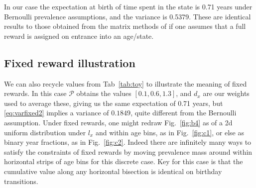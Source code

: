 \documentclass{bmcart}
\begin{document}
In our case the expectation at birth of time spent in the state is 0.71 years under Bernoulli prevalence assumptions, and the variance is 0.5379. These are identical results to those obtained from the matrix methods of \cite{caswell2018matrix} if one assumes that a full reward is assigned on entrance into an age/state.

\subsection{Fixed reward illustration}
We can also recycle values from Tab~\ref{tab:toy} to illustrate the meaning of fixed rewards. In this case $\mathcal{P}$ obtains the values $[0.1,0.6,1.3]$, and $d_x$ are our weights used to average these, giving us the same expectation of 0.71 years, but \eqref{eq:varfixed2} implies a variance of $0.1849$, quite different from the Bernoulli assumption. Under fixed rewards, one might redraw Fig.~\ref{fig:b4} as of a 2d uniform distribution under $l_x$ and within age bins, as in Fig.~\ref{fig:c1}, or else as binary year fractions, as in Fig.~\ref{fig:c2}. Indeed there are infinitely many ways to satisfy the constraints of fixed rewards by moving prevalence mass around within horizontal strips of age bins for this discrete case. Key for this case is that the cumulative value along any horizontal bisection is identical on birthday transitions.
\end{document}
